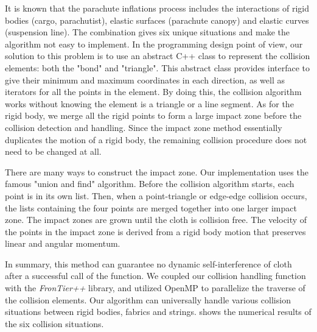 It is known that the parachute inflations process includes the interactions of rigid bodies (cargo, parachutist), elastic surfaces (parachute canopy) and elastic curves (suspension line). The combination gives six unique situations and make the algorithm not easy to implement. In the programming design point of view, our solution to this problem is to use an abstract C++ class to represent the collision elements: both the "bond" and "triangle". This abstract class provides interface to give their minimum and maximum coordinates in each direction, as well as iterators for all the points in the element. By doing this, the collision algorithm works without knowing the element is a triangle or a line segment. As for the rigid body, we merge all the rigid points to form a large impact zone before the collision detection and handling. Since the impact zone method essentially duplicates the motion of a rigid body, the remaining collision procedure does not need to be changed at all. 

There are many ways to construct the impact zone. Our implementation uses the famous "union and find" algorithm. Before the collision algorithm starts, each point is in its own list. Then, when a point-triangle or edge-edge collision occurs, the lists containing the four points are merged together into one larger impact zone. The impact zones are grown until the cloth is collision free. The velocity of the points in the impact zone is derived from a rigid body motion that preserves linear and angular momentum.

In summary, this method can guarantee no dynamic self-interference of cloth after a successful call of the function. We coupled our collision handling function with the {\it
FronTier++} library, and utilized OpenMP to parallelize the traverse of the collision elements. Our algorithm can universally handle various collision situations between rigid bodies, fabrics and strings.  shows the numerical results of the six collision situations.

